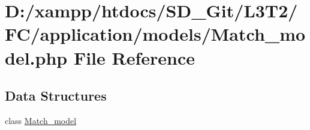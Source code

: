 \hypertarget{application_2models_2_match__model_8php}{}\section{D\+:/xampp/htdocs/\+S\+D\+\_\+\+Git/\+L3\+T2/\+F\+C/application/models/\+Match\+\_\+model.php File Reference}
\label{application_2models_2_match__model_8php}
\subsection*{Data Structures}
\begin{DoxyCompactItemize}
\item 
class \hyperlink{class_match__model}{Match\+\_\+model}
\end{DoxyCompactItemize}
